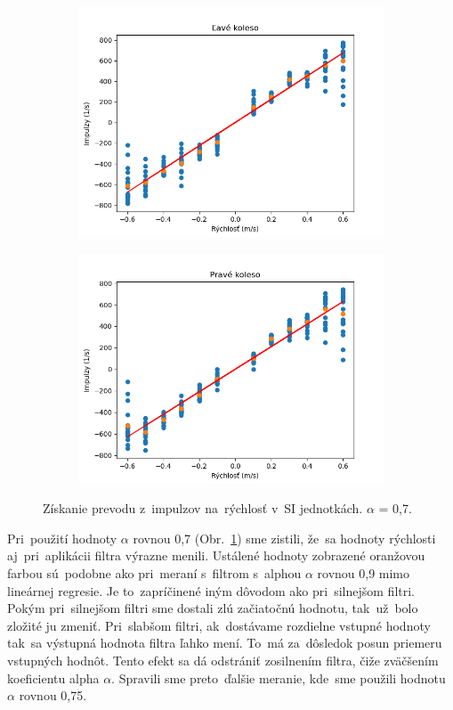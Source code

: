 \begin{figure}[!htbp]
	\begin{subfigure}{0.5\textwidth}
		\includegraphics[width=\textwidth]{img/lw_07250.png}
	\end{subfigure}
	\hfill
	\begin{subfigure}{0.5\textwidth}
		\includegraphics[width=\textwidth]{img/rw_07250.png}
	\end{subfigure}
	\caption{Získanie prevodu z~impulzov na~rýchlosť v~SI jednotkách. $\alpha$ = 0,7.}
	\label{fig:rw_lw_07250}
\end{figure}

Pri~použití hodnoty $\alpha$ rovnou 0,7 (Obr.~\ref{fig:rw_lw_07250}) sme zistili, že~sa hodnoty rýchlosti aj~pri~aplikácii
filtra výrazne menili. Ustálené hodnoty zobrazené oranžovou farbou sú~podobne ako pri~meraní s~filtrom s~alphou $\alpha$
rovnou 0,9 mimo lineárnej regresie. Je to~zapríčinené iným dôvodom ako pri~silnejšom filtri. Pokým pri~silnejšom filtri
sme dostali zlú začiatočnú hodnotu, tak~už~bolo zložité ju zmeniť. Pri~slabšom filtri, ak~dostávame rozdielne vstupné
hodnoty tak~sa výstupná hodnota filtra ľahko mení. To~má za~dôsledok posun priemeru vstupných hodnôt. Tento efekt sa dá
odstrániť zosilnením filtra, čiže zväčšením koeficientu alpha $\alpha$. Spravili sme preto~ďalšie meranie, kde~sme použili
hodnotu $\alpha$ rovnou 0,75.

